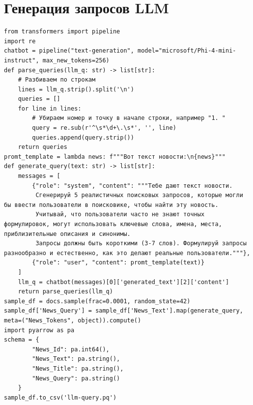 \documentclass[coursework]{SCWorks}
\begin{document}
\section{Генерация запросов LLM}
\label{apx:llm}
\begin{verbatim}
from transformers import pipeline
import re
chatbot = pipeline("text-generation", model="microsoft/Phi-4-mini-instruct", max_new_tokens=256)
def parse_queries(llm_q: str) -> list[str]:
    # Разбиваем по строкам
    lines = llm_q.strip().split('\n')
    queries = []
    for line in lines:
        # Убираем номер и точку в начале строки, например "1. "
        query = re.sub(r'^\s*\d+\.\s*', '', line)
        queries.append(query.strip())
    return queries
promt_template = lambda news: f"""Вот текст новости:\n{news}"""
def generate_query(text: str) -> list[str]:
    messages = [
        {"role": "system", "content": """Тебе дают текст новости. 
         Сгенерируй 5 реалистичных поисковых запросов, которые могли бы ввести пользователи в поисковике, чтобы найти эту новость. 
         Учитывай, что пользователи часто не знают точных формулировок, могут использовать ключевые слова, имена, места, приблизительные описания и синонимы. 
         Запросы должны быть короткими (3-7 слов). Формулируй запросы разнообразно и естественно, как это делают реальные пользователи."""},
        {"role": "user", "content": promt_template(text)}
    ]
    llm_q = chatbot(messages)[0]['generated_text'][2]['content']
    return parse_queries(llm_q)
sample_df = docs.sample(frac=0.0001, random_state=42)
sample_df['News_Query'] = sample_df['News_Text'].map(generate_query,  meta=("News_Tokens", object)).compute()
import pyarrow as pa
schema = {
        "News_Id": pa.int64(),
        "News_Text": pa.string(),
        "News_Title": pa.string(),
        "News_Query": pa.string()
    }
sample_df.to_csv('llm-query.pq')
\end{verbatim}
\end{document}
